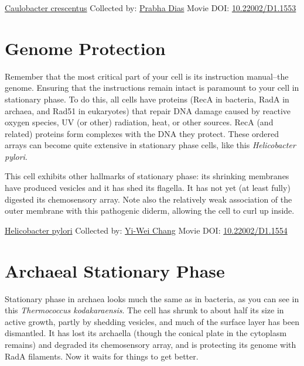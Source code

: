 \documentclass[]{tufte-book}
\begin{document}
\hypertarget{htmlwidget-21a203c74c4e81a70711}{}

\label{fig:8-1}\protect\hyperlink{tree}{Caulobacter crescentus} Collected by: \protect\hyperlink{prabha_dias}{Prabha Dias} Movie DOI: \href{https://doi.org/10.22002/D1.1553}{10.22002/D1.1553}

\hypertarget{genome-protection}{%
\section{Genome Protection}\label{genome-protection}}

Remember that the most critical part of your cell is its instruction manual--the genome. Ensuring that the instructions remain intact is paramount to your cell in stationary phase. To do this, all cells have proteins (RecA in bacteria, RadA in archaea, and Rad51 in eukaryotes) that repair DNA damage caused by reactive oxygen species, UV (or other) radiation, heat, or other sources. RecA (and related) proteins form complexes with the DNA they protect. These ordered arrays can become quite extensive in stationary phase cells, like this \emph{Helicobacter pylori}.

This cell exhibits other hallmarks of stationary phase: its shrinking membranes have produced vesicles and it has shed its flagella. It has not yet (at least fully) digested its chemosensory array. Note also the relatively weak association of the outer membrane with this pathogenic diderm, allowing the cell to curl up inside.



\hypertarget{htmlwidget-66d9a020002196d15c98}{}

\label{fig:8-2}\protect\hyperlink{tree}{Helicobacter pylori} Collected by: \protect\hyperlink{yi-wei_chang}{Yi-Wei Chang} Movie DOI: \href{https://doi.org/10.22002/D1.1554}{10.22002/D1.1554}

\hypertarget{archaeal-stationary-phase}{%
\section{Archaeal Stationary Phase}\label{archaeal-stationary-phase}}

Stationary phase in archaea looks much the same as in bacteria, as you can see in this \emph{Thermococcus kodakaraensis}. The cell has shrunk to about half its size in active growth, partly by shedding vesicles, and much of the surface layer has been dismantled. It has lost its archaella (though the conical plate in the cytoplasm remains) and degraded its chemosensory array, and is protecting its genome with RadA filaments. Now it waits for things to get better.
\end{document}
